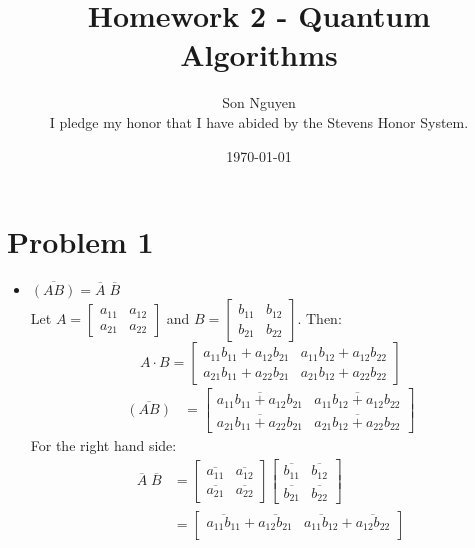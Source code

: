 \documentclass[12pt]{article}
\title{Homework 2 - Quantum Algorithms}
\author{Son Nguyen \\
I pledge my honor that I have abided by the Stevens Honor System.}
\date{\today}
\begin{document}
\maketitle
\section*{Problem 1}
\begin{itemize}
    \item \(\overline{(AB)} = \overline{A} \; \overline{B}\) \\
    Let \(A = \begin{bmatrix}
        a_{11} & a_{12} \\
        a_{21} & a_{22}
    \end{bmatrix}\) and \(B = \begin{bmatrix}
        b_{11} & b_{12} \\
        b_{21} & b_{22}
    \end{bmatrix}\). Then:
    \[A \cdot B = \begin{bmatrix}
        a_{11}b_{11} + a_{12}b_{21} & a_{11}b_{12} + a_{12}b_{22} \\
        a_{21}b_{11} + a_{22}b_{21} & a_{21}b_{12} + a_{22}b_{22}
    \end{bmatrix}\]
    \begin{align*}
        \overline{(AB)} &= \begin{bmatrix}
            \overline{a_{11}b_{11} + a_{12}b_{21}} & \overline{a_{11}b_{12} + a_{12}b_{22}} \\
            \overline{a_{21}b_{11} + a_{22}b_{21}} & \overline{a_{21}b_{12} + a_{22}b_{22}}
        \end{bmatrix}
    \end{align*}
    For the right hand side:
    \begin{align*}
        \overline{A} \; \overline{B} &= \begin{bmatrix}
            \overline{a_{11}} & \overline{a_{12}} \\
            \overline{a_{21}} & \overline{a_{22}}
        \end{bmatrix} \begin{bmatrix}
            \overline{b_{11}} & \overline{b_{12}} \\
            \overline{b_{21}} & \overline{b_{22}}
        \end{bmatrix} \\
        &= \begin{bmatrix}
            \overline{a_{11}b_{11}} + \overline{a_{12}b_{21}} & \overline{a_{11}b_{12}} + \overline{a_{12}b_{22}} \\

\end{bmatrix}
\end{align*}
\end{itemize}
\end{document}
